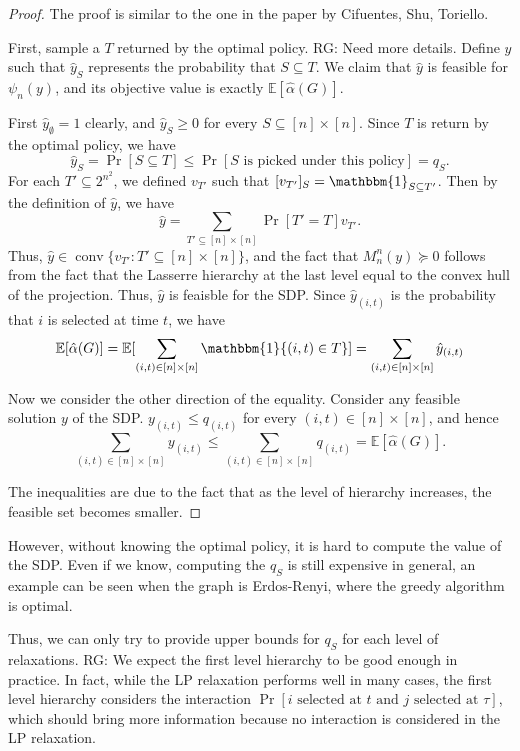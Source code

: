 \documentclass[10pt,leqno]{amsart}
\newcommand{\E}{\mathbb{E}}
\DeclareMathOperator{\conv}{conv}
\newcommand{\rgnote}[1]{{\color{magenta} RG: #1}}
\begin{document}
\begin{proof}
  The proof is similar to the one in the paper by Cifuentes, Shu, Toriello.
  
  First, sample a $T$ returned by the optimal policy.\rgnote{Need more details}.
  Define $\hat{y}$ such that $\hat{y}_S$ represents the probability that $S\subseteq T$.
  We claim that $\hat{y}$ is feasible for $\psi_n(y)$, and its objective value is exactly $\E[\hat{\alpha}(G)]$.

  First $\hat{y}_{\emptyset}=1$ clearly, and $\hat{y}_S\geq 0$ for every $S\subseteq [n]\times[n]$. Since $T$ is return by the optimal policy, we have 
  \[\hat{y}_S=\Pr[S\subseteq T]\leq\Pr[S\text{ is picked under this policy}]=q_S.\]
  For each $T'\subseteq 2^{n^2}$, we defined $v_{T'}$ such that $[v_{T'}]_S=\mathbbm{1}_{S\subseteq T'}$. Then by the definition of $\hat{y}$, we have 
  \[\hat{y}=\sum_{T'\subseteq[n]\times[n]}\Pr[T'=T]v_{T'}.\]
Thus, $\hat{y}\in\conv\{v_{T'}:T'\subseteq[n]\times[n]\}$, and the fact that $M_n^n(y)\succeq 0$ follows from the fact that the Lasserre hierarchy at the last level equal to the convex hull of the projection.
Thus, $\hat{y}$ is feaisble for the SDP.
Since $\hat{y}_{(i,t)}$ is the probability that $i$ is selected at time $t$, we have 
\[\E[\hat{\alpha}(G)]=\E[\sum_{(i,t)\in[n]\times[n]}\mathbbm{1}\{(i,t)\in T\}]=\sum_{(i,t)\in [n]\times[n]}\hat{{y}}_{(i,t)}\]

Now we consider the other direction of the equality. Consider any feasible solution $y$ of the SDP. $y_{(i,t)}\leq q_{(i,t)}$ for every $(i,t)\in[n]\times[n]$, and hence 
\[\sum_{(i,t)\in[n]\times[n]}y_{(i,t)}\leq \sum_{(i,t)\in[n]\times[n]}q_{(i,t)}=\E[\hat{\alpha}(G)].\]


  The inequalities are due to the fact that as the level of hierarchy increases, the feasible set becomes smaller.
\end{proof}
However, without knowing the optimal policy, it is hard to compute the value of the SDP. Even if we know, computing the $q_S$ is still expensive in general, an example can be seen when the graph is Erdos-Renyi, where the greedy algorithm is optimal.

Thus, we can only try to provide upper bounds for $q_S$ for each level of relaxations.
\rgnote{We expect the first level hierarchy to be good enough in practice. In fact, while the LP relaxation performs well in many cases, the first level hierarchy considers the interaction $\Pr[\text{$i$ selected at $t$ and $j$ selected at $\tau$}]$, which should bring more information because no interaction is considered in the LP relaxation.}
\end{document}
